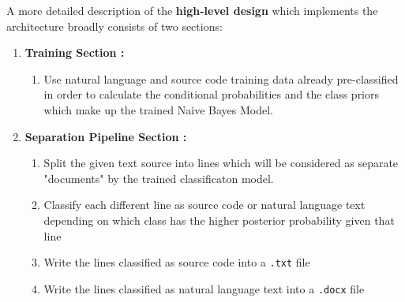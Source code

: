 \documentclass[12pt]{scrreprt}
\begin{document}
A more detailed description of the \textbf{high-level design} which implements the architecture broadly consists of two sections:
\begin{enumerate}
    \item \textbf{Training Section : }
    \begin{enumerate}
        \item Use natural language and source code training data already pre-classified in order to calculate the conditional probabilities and the class priors which make up the trained Naive Bayes Model.
    \end{enumerate}
    



    \item \textbf{Separation Pipeline Section : }
    \begin{enumerate}
        \item Split the given text source into lines which will be considered as separate "documents" by the trained classificaton model.
        \item Classify each different line as source code or natural language text depending on which class has the higher posterior probability given that line
        \item Write the lines classified as source code into a \texttt{.txt} file
        \item Write the lines classified as natural language text into a \texttt{.docx} file

\end{enumerate}
\end{enumerate}
\end{document}
